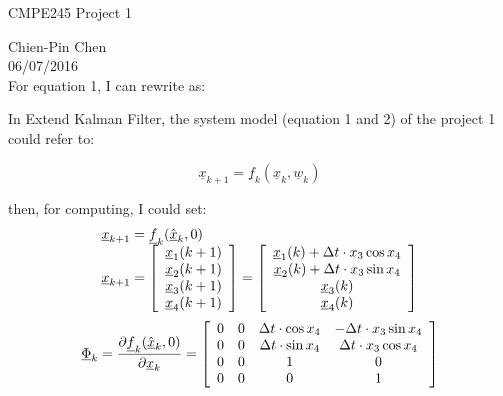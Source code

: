 \documentclass{article}
\begin{document}
\begin{center}
CMPE245 Project 1
\end{center}
Chien-Pin Chen\\
06/07/2016\\

For equation 1, I can rewrite as:

In Extend Kalman Filter, the system model (equation 1 and 2) of the project 1 could refer to:

\begin{equation}
	\underline{x}_{k + 1}  = \underline{f}_k (\underline{x}_k ,\underline{w}_k )
\end{equation}

then, for computing, I could set:
\begin{equation}
	\begin{array}{l}
	\underline{x}_{k + 1}  = \underline{f}_k (\hat{\underline{x}}_k ,0) \\ 
	 \underline{x}_{k + 1}  = \left[ {\begin{array}{*{20}c}
	   {\underline{x}_1 (k + 1)}  \\
	   {\underline{x}_2 (k + 1)}  \\
	   {\underline{x}_3 (k + 1)}  \\
	   {\underline{x}_4 (k + 1)}  \\
	\end{array}} \right] = \left[ {\begin{array}{*{20}c}
	   {\underline{x}_1 (k) + \Delta t \cdot x_3 \cos x_4 }  \\
	   {\underline{x}_2 (k) + \Delta t \cdot x_3 \sin x_4 }  \\
	   {\underline{x}_3 (k)}  \\
	   {\underline{x}_4 (k)}  \\
	\end{array}} \right] \\ 
	 \end{array}
\end{equation}
\begin{equation}
	\underline{\Phi} _k  = \frac{{\partial \underline{f}_k (\hat{\underline{x}}_k ,0)}}{{\partial \underline{x}_k }} = \left[ {\begin{array}{*{20}c}
	   0 & 0 & {\Delta t \cdot \cos x_4 } & { - \Delta t \cdot x_3 \sin x_4 }  \\
	   0 & 0 & {\Delta t \cdot \sin x_4 } & {\Delta t \cdot x_3 \cos x_4 }  \\
	   0 & 0 & 1 & 0  \\
	   0 & 0 & 0 & 1  \\
	\end{array}} \right]
\end{equation}
\end{document}
